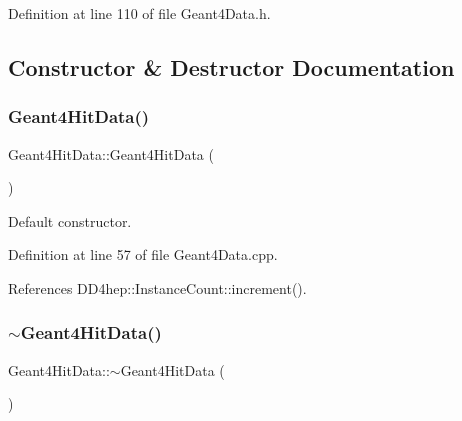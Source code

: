 Definition at line 110 of file Geant4\+Data.\+h.



\subsection{Constructor \& Destructor Documentation}
\hypertarget{class_d_d4hep_1_1_simulation_1_1_geant4_hit_data_a720c9f6193739b3ce4f23c321a4af1be}{}\label{class_d_d4hep_1_1_simulation_1_1_geant4_hit_data_a720c9f6193739b3ce4f23c321a4af1be} 
\subsubsection{\texorpdfstring{Geant4\+Hit\+Data()}{Geant4HitData()}}
{\footnotesize\ttfamily Geant4\+Hit\+Data\+::\+Geant4\+Hit\+Data (\begin{DoxyParamCaption}{ }\end{DoxyParamCaption})}



Default constructor. 



Definition at line 57 of file Geant4\+Data.\+cpp.



References D\+D4hep\+::\+Instance\+Count\+::increment().

\hypertarget{class_d_d4hep_1_1_simulation_1_1_geant4_hit_data_a57540b8795c4a198a0925773269d99f3}{}\label{class_d_d4hep_1_1_simulation_1_1_geant4_hit_data_a57540b8795c4a198a0925773269d99f3} 
\subsubsection{\texorpdfstring{$\sim$\+Geant4\+Hit\+Data()}{~Geant4HitData()}}
{\footnotesize\ttfamily Geant4\+Hit\+Data\+::$\sim$\+Geant4\+Hit\+Data (\begin{DoxyParamCaption}{ }\end{DoxyParamCaption})\hspace{0.3cm}{\ttfamily [virtual]}}



